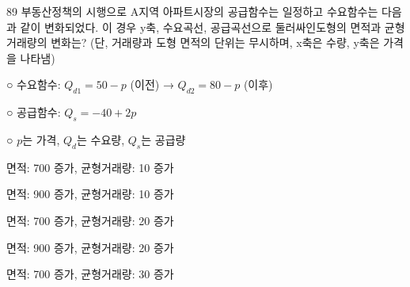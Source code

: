 \begin{question}{89}
부동산정책의 시행으로 A지역 아파트시장의 공급함수는 일정하고 수요함수는 다음과 같이 변화되었다. 이 경우 y축, 수요곡선, 공급곡선으로 둘러싸인도형의 면적과 균형거래량의 변화는? (단, 거래량과 도형 면적의 단위는 무시하며, x축은 수량, y축은 가격을 나타냄)
\begin{framedtext}
○ 수요함수: $Q_{d1}=50-p$ (이전) → $Q_{d2}=80-p$ (이후) \par
○ 공급함수: $Q_{s}=-40+2p$ \par
○ $p$는 가격, $Q_{d}$는 수요량, $Q_{s}$는 공급량 \par
\end{framedtext}
\begin{choices}
  \item 면적: 700 증가, 균형거래량: 10 증가
  \item 면적: 900 증가, 균형거래량: 10 증가
  \item 면적: 700 증가, 균형거래량: 20 증가
  \item 면적: 900 증가, 균형거래량: 20 증가
  \item 면적: 700 증가, 균형거래량: 30 증가
\end{choices}
\end{question}
